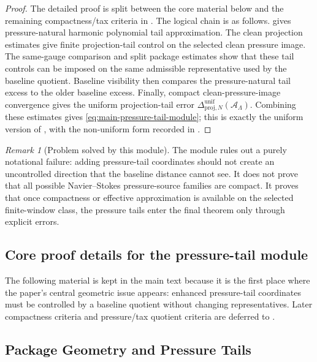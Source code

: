 \documentclass[11pt]{article}
\numberwithin{equation}{section}
\theoremstyle{definition}
\theoremstyle{remark}
\newtheorem{remark}[remark]{Remark}
\newcommand{\proj}{\mathrm{proj}}
\newcommand{\calA}{\mathcal A}
\begin{document}
\begin{proof}
The detailed proof is split between the core material below and the remaining compactness/tax criteria in .  The logical chain is as follows.   gives pressure-natural harmonic polynomial tail approximation.  The clean projection estimates give finite projection-tail control on the selected clean pressure image.  The same-gauge comparison and split package estimates show that these tail controls can be imposed on the same admissible representative used by the baseline quotient.  Baseline visibility then compares the pressure-natural tail excess to the older baseline excess.  Finally, compact clean-pressure-image convergence gives the uniform projection-tail error \(\Delta^{\mathrm{unif}}_{\proj,N}(\calA_\Lambda)\).  Combining these estimates gives \eqref{eq:main-pressure-tail-module}; this is exactly the uniform version of , with the non-uniform form recorded in .
\end{proof}

\begin{remark}[Problem solved by this module]
The module rules out a purely notational failure: adding pressure-tail coordinates should not create an uncontrolled direction that the baseline distance cannot see.  It does not prove that all possible Navier--Stokes pressure-source families are compact.  It proves that once compactness or effective approximation is available on the selected finite-window class, the pressure tails enter the final theorem only through explicit errors.
\end{remark}


\subsection*{Core proof details for the pressure-tail module}

The following material is kept in the main text because it is the first place where the paper's central geometric issue appears: enhanced pressure-tail coordinates must be controlled by a baseline quotient without changing representatives.  Later compactness criteria and pressure/tax quotient criteria are deferred to .

\subsection*{Package Geometry and Pressure Tails}
\label{part:pressure-tail}
\end{document}
